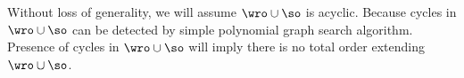 

Without loss of generality, we will assume $\wro \cup \so$ is acyclic. Because cycles in $\wro \cup \so$ can be detected by simple polynomial graph search algorithm. Presence of cycles in $\wro \cup \so$ will imply there is no total order extending $\wro \cup \so$. 
